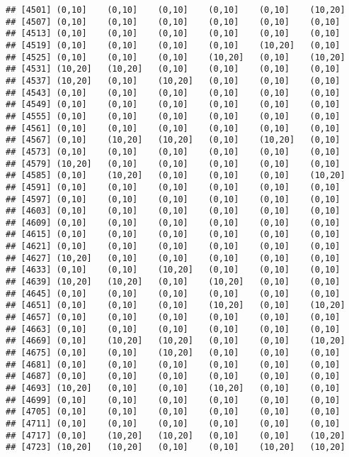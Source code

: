\documentclass[]{article}
\begin{document}
\begin{verbatim}
## [4501] (0,10]    (0,10]    (0,10]    (0,10]    (0,10]    (10,20]  
## [4507] (0,10]    (0,10]    (0,10]    (0,10]    (0,10]    (0,10]   
## [4513] (0,10]    (0,10]    (0,10]    (0,10]    (0,10]    (0,10]   
## [4519] (0,10]    (0,10]    (0,10]    (0,10]    (10,20]   (0,10]   
## [4525] (0,10]    (0,10]    (0,10]    (10,20]   (0,10]    (10,20]  
## [4531] (10,20]   (10,20]   (0,10]    (0,10]    (0,10]    (0,10]   
## [4537] (10,20]   (0,10]    (10,20]   (0,10]    (0,10]    (0,10]   
## [4543] (0,10]    (0,10]    (0,10]    (0,10]    (0,10]    (0,10]   
## [4549] (0,10]    (0,10]    (0,10]    (0,10]    (0,10]    (0,10]   
## [4555] (0,10]    (0,10]    (0,10]    (0,10]    (0,10]    (0,10]   
## [4561] (0,10]    (0,10]    (0,10]    (0,10]    (0,10]    (0,10]   
## [4567] (0,10]    (10,20]   (10,20]   (0,10]    (10,20]   (0,10]   
## [4573] (0,10]    (0,10]    (0,10]    (0,10]    (0,10]    (0,10]   
## [4579] (10,20]   (0,10]    (0,10]    (0,10]    (0,10]    (0,10]   
## [4585] (0,10]    (10,20]   (0,10]    (0,10]    (0,10]    (10,20]  
## [4591] (0,10]    (0,10]    (0,10]    (0,10]    (0,10]    (0,10]   
## [4597] (0,10]    (0,10]    (0,10]    (0,10]    (0,10]    (0,10]   
## [4603] (0,10]    (0,10]    (0,10]    (0,10]    (0,10]    (0,10]   
## [4609] (0,10]    (0,10]    (0,10]    (0,10]    (0,10]    (0,10]   
## [4615] (0,10]    (0,10]    (0,10]    (0,10]    (0,10]    (0,10]   
## [4621] (0,10]    (0,10]    (0,10]    (0,10]    (0,10]    (0,10]   
## [4627] (10,20]   (0,10]    (0,10]    (0,10]    (0,10]    (0,10]   
## [4633] (0,10]    (0,10]    (10,20]   (0,10]    (0,10]    (0,10]   
## [4639] (10,20]   (10,20]   (0,10]    (10,20]   (0,10]    (0,10]   
## [4645] (0,10]    (0,10]    (0,10]    (0,10]    (0,10]    (0,10]   
## [4651] (0,10]    (0,10]    (0,10]    (10,20]   (0,10]    (10,20]  
## [4657] (0,10]    (0,10]    (0,10]    (0,10]    (0,10]    (0,10]   
## [4663] (0,10]    (0,10]    (0,10]    (0,10]    (0,10]    (0,10]   
## [4669] (0,10]    (10,20]   (10,20]   (0,10]    (0,10]    (10,20]  
## [4675] (0,10]    (0,10]    (10,20]   (0,10]    (0,10]    (0,10]   
## [4681] (0,10]    (0,10]    (0,10]    (0,10]    (0,10]    (0,10]   
## [4687] (0,10]    (0,10]    (0,10]    (0,10]    (0,10]    (0,10]   
## [4693] (10,20]   (0,10]    (0,10]    (10,20]   (0,10]    (0,10]   
## [4699] (0,10]    (0,10]    (0,10]    (0,10]    (0,10]    (0,10]   
## [4705] (0,10]    (0,10]    (0,10]    (0,10]    (0,10]    (0,10]   
## [4711] (0,10]    (0,10]    (0,10]    (0,10]    (0,10]    (0,10]   
## [4717] (0,10]    (10,20]   (10,20]   (0,10]    (0,10]    (10,20]  
## [4723] (10,20]   (10,20]   (0,10]    (0,10]    (10,20]   (10,20]  

\end{verbatim}
\end{document}
